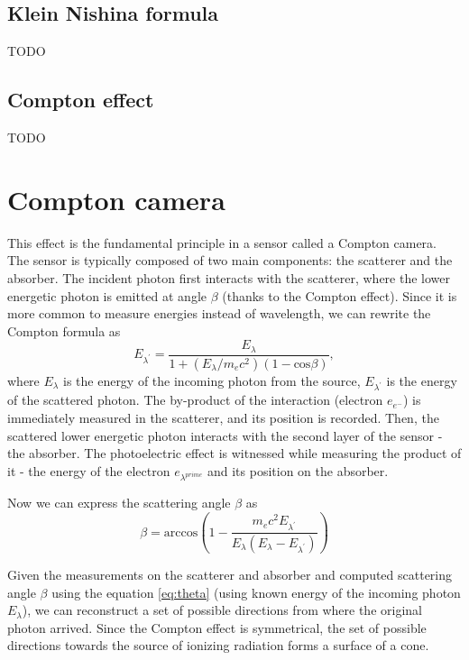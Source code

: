 {  \subsection{Klein Nishina formula}
  TODO

  \subsection{Compton effect}
  TODO


  \section{Compton camera}
  This effect is the fundamental principle in a sensor called a Compton camera. 
  The sensor is typically composed of two main components: the scatterer and the absorber. 
  The incident photon first interacts with the scatterer, where the lower energetic photon is emitted at angle $\beta$ (thanks to the Compton effect). 
  Since it is more common to measure energies instead of wavelength, we can rewrite the Compton formula as
  \begin{equation}
  E_{\lambda^{\prime}} = \frac{E_{\lambda}}{  1 + (E_{\lambda} / m_{e}c^{2}) (1 - \mathrm{cos} \beta)},
  \end{equation}
  where $E_{\lambda}$ is the energy of the incoming photon from the source, $E_{\lambda^{\prime}}$ is the energy of the scattered photon.  
  The by-product of the interaction (electron $e_{e^{-}}$) is immediately measured in the scatterer, and its position is recorded.
  Then, the scattered lower energetic photon interacts with the second layer of the sensor - the absorber. 
  The photoelectric effect is witnessed while measuring the product of it - the energy of the electron $e_{\lambda^{prime}}$ and its position on the absorber.

  Now we can express the scattering angle $\beta$ as
  \begin{equation}
      \beta = \mathrm{arccos} \left (  1-\frac{m_{e}c^{2}E_{\lambda^{\prime}}}{E_{\lambda} (E_{\lambda} - E_{\lambda^{\prime}})} \right )
  \end{equation}

  Given the measurements on the scatterer and absorber and computed scattering angle $\beta$ using the equation \autoref{eq:theta} (using known energy of the incoming photon $E_{\lambda}$), we can reconstruct a set of possible directions from where the original photon arrived. Since the Compton effect is symmetrical, the set of possible directions towards the source of ionizing radiation forms a surface of a cone.



}
